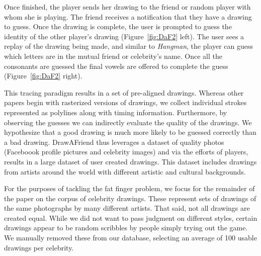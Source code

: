 Once finished, the player sends her drawing to the friend or random player with whom she is playing. The friend receives a notification that they have a drawing to guess. Once the drawing is complete, the user is prompted to guess the identity of the other player's drawing (Figure~\ref{fig:DaF2} left). The user sees a replay of the drawing being made, and similar to {\em Hangman}, the player can guess which letters are in the mutual friend or celebrity's name. Once all the consonants are guessed the final vowels are offered to complete the guess (Figure~\ref{fig:DaF2} right).

This tracing paradigm results in a set of pre-aligned drawings. Whereas other papers begin with rasterized versions of drawings, we collect individual strokes represented as polylines along with timing information.  Furthermore, by observing the guesses we can indirectly evaluate the quality of the drawings. We hypothesize that a good drawing is much more likely to be guessed correctly than a bad drawing. DrawAFriend thus leverages a dataset of quality photos (Faceboook profile pictures and celebrity images) and via the efforts of players, results in a large dataset of user created drawings. This dataset includes drawings from artists around the world with different artistic and cultural backgrounds.

For the purposes of tackling the fat finger problem, we focus for the remainder of the paper on the corpus of celebrity drawings. These represent sets of drawings of the same photographs by many different artists. That said, not all drawings are created equal. While we did not want to pass judgment on different styles, certain drawings appear to be random scribbles by people simply trying out the game. We manually removed these from our database, selecting an average of 100 usable drawings per celebrity.

